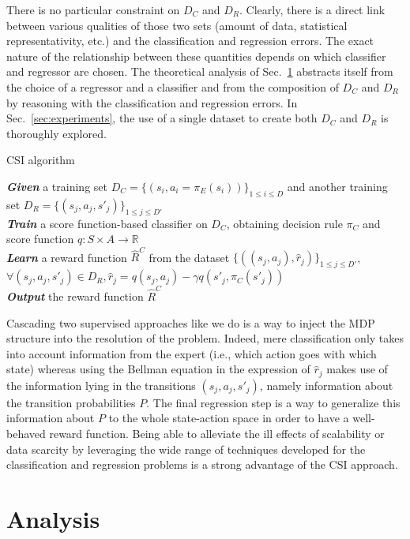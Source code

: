 \documentclass{llncs}
\begin{document}
There is no particular constraint on $D_C$ and $D_R$. Clearly, there is a direct link between various qualities of those two sets (amount of data, statistical representativity, etc.) and the classification and regression errors. The exact nature of the relationship between these quantities depends on which classifier and regressor are chosen. The theoretical analysis of Sec.~\ref{sec:analysis} abstracts itself from the choice of a regressor and a classifier and from the composition of $D_C$ and $D_R$ by reasoning with the classification and regression errors. In Sec.~\ref{sec:experiments}, %
the use of a single dataset to create both $D_C$ and $D_R$ is thoroughly explored.
\begin{algorithm}%
  \caption{CSI algorithm}
  \label{algo:cascading}
  \emph{\textbf{Given}} a training set $D_C=\{(s_i,a_i=\pi_E(s_i))\}_{1\leq i \leq D}$ and another training set $D_R=\{(s_{j},a_{j},s'_{j})\}_{1\leq j \leq D'}$\;\\
  \emph{\textbf{Train}} a score function-based classifier on $D_C$, obtaining decision rule $\pi_C$ and score function $q:S\times A \rightarrow \mathbb R$\;\\
  \emph{\textbf{Learn}} a reward function $\hat R^C$ from the dataset $\{((s_{j},a_{j}),\hat{r}_j)\}_{1\leq j \leq D'}$, $\forall (s_j,a_j,s'_j) \in D_R,\hat{r}_j=q(s_{j},a_{j})-\gamma q(s'_{j},\pi_C(s'_{j}))$\;\\
  \emph{\textbf{Output}} the reward function $\hat R^{C}$ \;
\end{algorithm}

Cascading two supervised approaches like we do is a way to inject the MDP structure into the resolution of the problem. Indeed, mere classification only takes into account information from the expert (i.e., which action goes with which state) whereas using the Bellman equation in the expression of $\hat r_j$ makes use of the information lying in the transitions $(s_j,a_j,s'_j)$, namely information about the transition probabilities $P$. The final regression step is a way to generalize this information about $P$ to the whole state-action space in order to have a well-behaved reward function. Being able to alleviate the ill effects of scalability or data scarcity by leveraging the wide range of techniques developed for the classification and regression problems is a strong advantage of the CSI approach.

\section{Analysis}
\label{sec:analysis}
\end{document}
